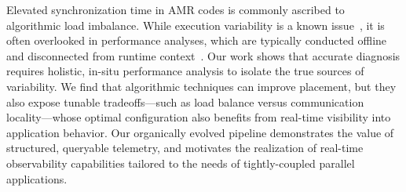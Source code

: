 Elevated synchronization time in AMR codes is commonly ascribed to algorithmic load imbalance.
While execution variability is a known
issue~\cite{Petri2003:Missing,Hoefl2010:Noise,Gunaw2018:FailSlow,Gangi2024:RDMA,Acun2016:Variation,Acun2016:Mitigating,Yildi2016:IONoise},
it is often overlooked in performance analyses, which are typically conducted offline and
disconnected from runtime context~\cite{Klenk2017:OverviewMPICharacteristics}.
Our work shows that accurate diagnosis requires holistic, in-situ performance analysis to isolate
the true sources of variability.
We find that algorithmic techniques can improve placement, but they also expose tunable
tradeoffs---such as load balance versus communication locality---whose optimal configuration also
benefits from real-time visibility into application behavior.
Our organically evolved pipeline demonstrates the value of structured, queryable telemetry, and
motivates the realization of real-time observability capabilities tailored to the needs of
tightly-coupled parallel applications.



\newpage